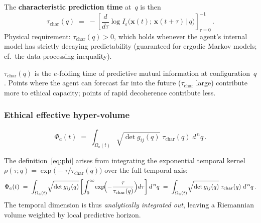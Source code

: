The \textbf{characteristic prediction time} at~$q$ is then
\begin{equation}
\label{eq:tau-char}
    \tau_{\mathrm{char}}(q)
    \;=\;
    -\left[\frac{d}{d\tau}\log I_\varepsilon
       \bigl(\mathbf{x}(t);\,\mathbf{x}(t+\tau)\,\big|\,q\bigr)
    \right]^{-1}_{\!\tau=0}\,.
\end{equation}
Physical requirement: $\tau_{\mathrm{char}}(q)>0$, which holds whenever the
agent's internal model has strictly decaying predictability
(guaranteed for ergodic Markov models; cf.\ the data-processing inequality).

\begin{remark}[Interpretation]
$\tau_{\mathrm{char}}(q)$ is the $e$-folding time of predictive mutual information
at configuration~$q$.  Points where the agent can forecast far into the
future ($\tau_{\mathrm{char}}$ large) contribute more to ethical capacity;
points of rapid decoherence contribute less.
\end{remark}

\subsubsection{Ethical effective hyper-volume}
\label{sec:phi}

\begin{definition}
\begin{equation}
\label{eq:phi}
\boxed{\;
    \Phi_a(t)
    \;=\;
    \int_{\Omega_a(t)}\!
        \sqrt{\det g_{ij}(q)}\;\tau_{\mathrm{char}}(q)\;d^{\,n}q\,.
\;}
\end{equation}
\end{definition}

\begin{remark}
The definition~\eqref{eq:phi} arises from integrating the exponential
temporal kernel $\rho(\tau;q)=\exp\!\bigl(-\tau/\tau_{\mathrm{char}}(q)\bigr)$
over the full temporal axis:
\[
    \Phi_a(t)
    \;=\;
    \int_{\Omega_a(t)}\!\sqrt{\det g_{ij}(q)}
    \left[\int_0^{\infty}\!\exp\!\Bigl(-\frac{\tau}{\tau_{\mathrm{char}}(q)}\Bigr)d\tau\right]
    d^{\,n}q
    \;=\;
    \int_{\Omega_a(t)}\!\sqrt{\det g_{ij}(q)}\;\tau_{\mathrm{char}}(q)\;d^{\,n}q\,.
\]
The temporal dimension is thus \emph{analytically integrated out},
leaving a Riemannian volume weighted by local predictive horizon.
\end{remark}


